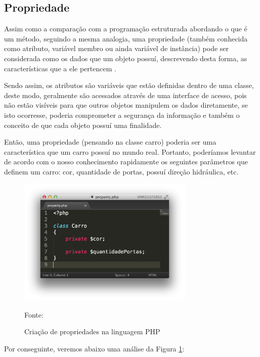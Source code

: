 \subsection{Propriedade}
Assim como a comparação com a programação estruturada abordando o que é um
método, seguindo a mesma analogia, uma propriedade (também conhecida como
atributo, variável membro ou ainda variável de instância) pode ser considerada
como os dados que um objeto possuí, descrevendo desta forma, as características
que a ele pertencem \cite{programmingPhp}.

Sendo assim, os atributos são variáveis que estão definidas dentro de uma
classe, deste modo, geralmente são acessados através de uma interface de acesso,
pois não estão visíveis para que outros objetos manipulem os dados diretamente,
se isto ocorresse, poderia comprometer a segurança da informação e também o
conceito de que cada objeto possuí uma finalidade.

Então, uma propriedade (pensando na classe carro) poderia ser uma característica
que um carro possuí no mundo real. Portanto, poderíamos levantar de acordo com
o nosso conhecimento rapidamente os seguintes parâmetros que definem um carro:
cor, quantidade de portas, possuí direção hidráulica, etc.

\begin{figure}[h!tb]
	\caption{Criação de propriedades na linguagem PHP}
	\label{fig:propriedade}

	\centering
	\includegraphics[width=0.75\textwidth]{images/property.png}

	\centering
	\footnotesize Fonte: \fonteOAutor
\end{figure}

\FloatBarrier 	%

Por conseguinte, veremos abaixo uma análise da Figura \ref{fig:propriedade}:

